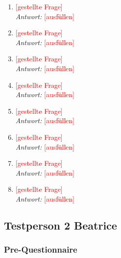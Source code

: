 \documentclass[../Main.tex]{subfiles}
\begin{document}
\begin{enumerate}[label=\textbf{I\arabic*}, leftmargin=1.5cm, itemsep=1em]
    \item \textcolor{red}{[gestellte Frage]} \\
        \textit{Antwort:} \textcolor{red}{[ausfüllen]}

    \item \textcolor{red}{[gestellte Frage]} \\
        \textit{Antwort:} \textcolor{red}{[ausfüllen]}

    \item \textcolor{red}{[gestellte Frage]} \\
        \textit{Antwort:} \textcolor{red}{[ausfüllen]}

    \item \textcolor{red}{[gestellte Frage]} \\
        \textit{Antwort:} \textcolor{red}{[ausfüllen]}

    \item \textcolor{red}{[gestellte Frage]} \\
        \textit{Antwort:} \textcolor{red}{[ausfüllen]}

    \item \textcolor{red}{[gestellte Frage]} \\
        \textit{Antwort:} \textcolor{red}{[ausfüllen]}

    \item \textcolor{red}{[gestellte Frage]} \\
        \textit{Antwort:} \textcolor{red}{[ausfüllen]}

    \item \textcolor{red}{[gestellte Frage]} \\
        \textit{Antwort:} \textcolor{red}{[ausfüllen]}
\end{enumerate}

\subsection{Testperson 2 Beatrice}

\subsubsection{Pre-Questionnaire}
\end{document}
